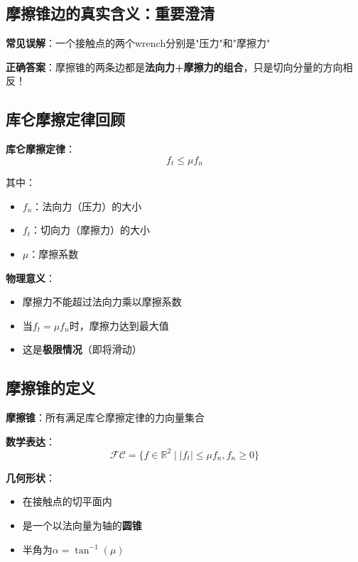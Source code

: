 \documentclass[12pt,a4paper]{article}
\begin{document}
\subsection{摩擦锥边的真实含义：重要澄清}

\textbf{常见误解}：一个接触点的两个wrench分别是"压力"和"摩擦力"

\textbf{正确答案}：摩擦锥的两条边都是\textbf{法向力+摩擦力的组合}，只是切向分量的方向相反！

\subsection{库仑摩擦定律回顾}

\textbf{库仑摩擦定律}：
\begin{equation}
f_t \leq \mu f_n
\label{eq:coulomb_friction}
\end{equation}

其中：
\begin{itemize}
\item $f_n$：法向力（压力）的大小
\item $f_t$：切向力（摩擦力）的大小
\item $\mu$：摩擦系数
\end{itemize}

\textbf{物理意义}：
\begin{itemize}
\item 摩擦力不能超过法向力乘以摩擦系数
\item 当$f_t = \mu f_n$时，摩擦力达到最大值
\item 这是\textbf{极限情况}（即将滑动）
\end{itemize}

\subsection{摩擦锥的定义}

\textbf{摩擦锥}：所有满足库仑摩擦定律的力向量集合

\textbf{数学表达}：
\begin{equation}
\mathcal{FC} = \{f \in \mathbb{R}^2 \mid |f_t| \leq \mu f_n, f_n \geq 0\}
\end{equation}

\textbf{几何形状}：
\begin{itemize}
\item 在接触点的切平面内
\item 是一个以法向量为轴的\textbf{圆锥}
\item 半角为$\alpha = \tan^{-1}(\mu)$
\end{itemize}
\end{document}

